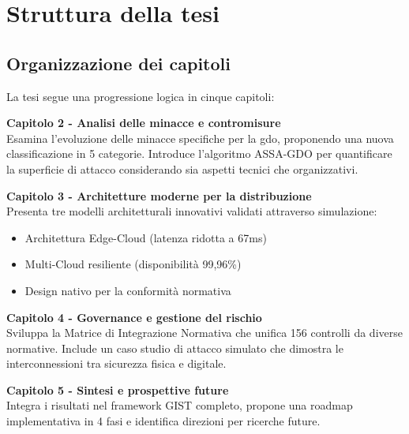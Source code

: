 \section{Struttura della tesi}
\label{sec:struttura_tesi}

\subsection{Organizzazione dei capitoli}
\label{subsec:organizzazione}

La tesi segue una progressione logica in cinque capitoli:

\textbf{Capitolo 2 - Analisi delle minacce e contromisure}\\
Esamina l'evoluzione delle minacce specifiche per la \gls{gdo}, proponendo una nuova classificazione in 5 categorie. Introduce l'algoritmo ASSA-GDO per quantificare la superficie di attacco considerando sia aspetti tecnici che organizzativi.

\textbf{Capitolo 3 - Architetture moderne per la distribuzione}\\
Presenta tre modelli architetturali innovativi validati attraverso simulazione:
\begin{itemize}
\item Architettura Edge-Cloud (latenza ridotta a 67ms)
\item Multi-Cloud resiliente (disponibilità 99,96\%)
\item Design nativo per la conformità normativa
\end{itemize}

\textbf{Capitolo 4 - Governance e gestione del rischio}\\
Sviluppa la Matrice di Integrazione Normativa che unifica 156 controlli da diverse normative. Include un caso studio di attacco simulato che dimostra le interconnessioni tra sicurezza fisica e digitale.

\textbf{Capitolo 5 - Sintesi e prospettive future}\\
Integra i risultati nel framework GIST completo, propone una roadmap implementativa in 4 fasi e identifica direzioni per ricerche future.

